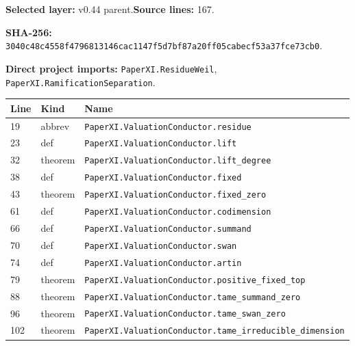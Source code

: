 \documentclass[10pt,oneside]{book}
\begin{document}
\textbf{Selected layer:} v0.44 parent.\quad\textbf{Source lines:} 167.\par\textbf{SHA-256:} {\scriptsize\nolinkurl{3040c48c4558f4796813146cac1147f5d7bf87a20ff05cabecf53a37fce73cb0}}.


\textbf{Direct project imports:} \nolinkurl{PaperXI.ResidueWeil}, \nolinkurl{PaperXI.RamificationSeparation}.

\begin{longtable}{@{}p{}p{}p{}@{}}\toprule Line&Kind&Name\\\midrule\endhead

19&abbrev&\nolinkurl{PaperXI.ValuationConductor.residue}\\

23&def&\nolinkurl{PaperXI.ValuationConductor.lift}\\

32&theorem&\nolinkurl{PaperXI.ValuationConductor.lift_degree}\\

38&def&\nolinkurl{PaperXI.ValuationConductor.fixed}\\

43&theorem&\nolinkurl{PaperXI.ValuationConductor.fixed_zero}\\

61&def&\nolinkurl{PaperXI.ValuationConductor.codimension}\\

66&def&\nolinkurl{PaperXI.ValuationConductor.summand}\\

70&def&\nolinkurl{PaperXI.ValuationConductor.swan}\\

74&def&\nolinkurl{PaperXI.ValuationConductor.artin}\\

79&theorem&\nolinkurl{PaperXI.ValuationConductor.positive_fixed_top}\\

88&theorem&\nolinkurl{PaperXI.ValuationConductor.tame_summand_zero}\\

96&theorem&\nolinkurl{PaperXI.ValuationConductor.tame_swan_zero}\\

102&theorem&\nolinkurl{PaperXI.ValuationConductor.tame_irreducible_dimension}\\


\end{longtable}
\end{document}
